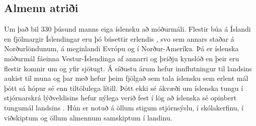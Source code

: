 \begin{multicols}{2}

\subsection{Almenn atriði}

Um það bil 330 þúsund manns eiga íslensku að móðurmáli. Flestir búa á Íslandi \cite{hag1}  en fjölmargir Íslendingar eru þó búsettir erlendis \cite{vis1},  svo sem annars staðar á Norðurlöndunum, á meginlandi Evrópu og í Norður-Ameríku. Þá er íslenska móðurmál fáeinna Vestur-Íslendinga af annarri og þriðju kynslóð \cite{can1}  en þeir eru flestir komnir um og yfir sjötugt. Á síðustu árum hefur innflutningur til landsins aukist til muna og þar með hefur þeim fjölgað sem tala íslensku sem erlent mál þótt sá hópur sé enn tiltölulega lítill.
Þótt ekki sé ákvæði um íslenska tungu í stjórnarskrá lýðveldisins hefur nýlega verið fest í lög að íslenska sé opinbert tungumál landsins \cite{alt1}. Hún er notuð á öllum stigum stjórnsýslu, í skólakerfinu, í viðskiptum og öllum almennum samskiptum í landinu. 


\end{multicols}
